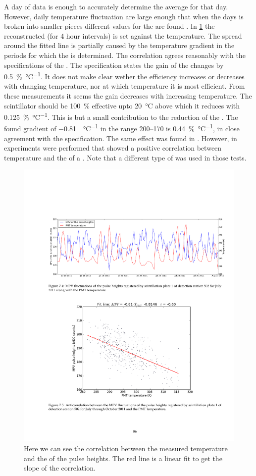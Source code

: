 A day of data is enough to accurately determine the average \mpv for that day. However, daily temperature fluctuation are large enough that when the days is broken into smaller pieces different values for the \mpv are found \cite{bartels2012mpv}. In \cref{fig:mpv_temperature} the reconstructed \mpv (for 4 hour intervals) is set against the \pmt temperature. The spread around the fitted line is partially caused by the temperature gradient in the periods for which the \mpv is determined. The correlation agrees reasonably with the specifications of the \pmt. The specification states the gain of the \pmt changes by \SI{0.5}{\percent\per\degreeCelsius}. It does not make clear wether the efficiency increases or decreases with changing temperature, nor at which temperature it is most efficient. From these measurements it seems the gain decreases with increasing temperature. The scintillator should be \SI{100}{\percent} effective upto \SI{20}{\degreeCelsius} above which it reduces with \SI{0.125}{\percent\per\degreeCelsius}. This is but a small contribution to the reduction of the \mpv. The found gradient of \SI{-0.81}{\adc\per\degreeCelsius} in the range \SIrange{200}{170}{\adc} is \SI{0.44}{\percent\per\degreeCelsius}, in close agreement with the specification. The same effect was found in \cite[Section 3.6]{lio2011}. However, in \cite[Section 3.5]{lio2010} experiments were performed that showed a positive correlation between temperature and the \mpv of a \pmt. Note that a different type of \pmt was used in those tests.

\begin{figure}
    \centering
    \includegraphics[width=0.7\linewidth]{plots/station/mpv_temperature}
    \caption{Here we can see the correlation between the measured temperature and the \mpv of the pulse heights. The red line is a linear fit to get the slope of the correlation.}
    \label{fig:mpv_temperature}
\end{figure}

